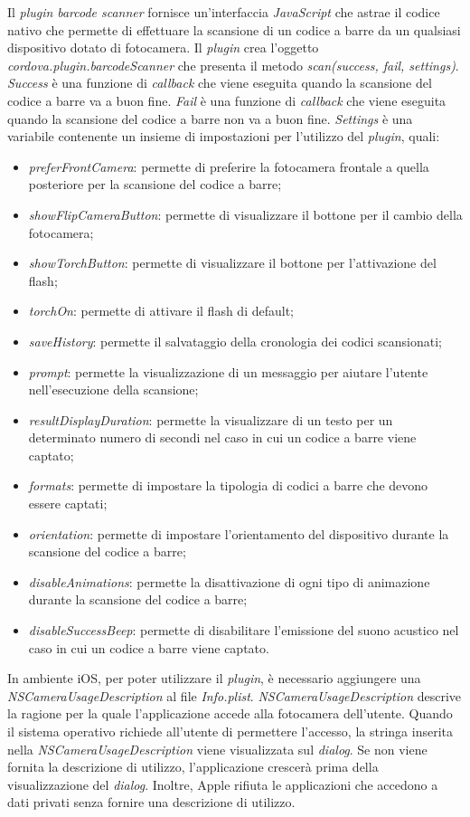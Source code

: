Il \textit{plugin} \textit{barcode scanner} fornisce un'interfaccia \textit{JavaScript} che astrae il codice nativo che permette di effettuare la scansione di un codice a barre da un qualsiasi dispositivo dotato di fotocamera. Il \textit{plugin} crea l'oggetto \textit{cordova.plugin.barcodeScanner} che presenta il metodo \textit{scan(success, fail, settings)}. \textit{Success} è una funzione di \textit{callback} che viene eseguita quando la scansione del codice a barre va a buon fine. \textit{Fail} è una funzione di \textit{callback} che viene eseguita quando la scansione del codice a barre non va a buon fine. \textit{Settings} è una variabile contenente un insieme di impostazioni per l'utilizzo del \textit{plugin}, quali:
\begin{itemize}
	\item \textit{preferFrontCamera}: permette di preferire la fotocamera frontale a quella posteriore per la scansione del codice a barre;
	\item \textit{showFlipCameraButton}: permette di visualizzare il bottone per il cambio della fotocamera;
	\item \textit{showTorchButton}: permette di visualizzare il bottone per l'attivazione del flash;
	\item \textit{torchOn}: permette di attivare il flash di default;
	\item \textit{saveHistory}: permette il salvataggio della cronologia dei codici scansionati;
	\item \textit{prompt}: permette la visualizzazione di un messaggio per aiutare l'utente nell'esecuzione della scansione;
	\item \textit{resultDisplayDuration}: permette la visualizzare di un testo per un determinato numero di secondi nel caso in cui un codice a barre viene captato;
	\item \textit{formats}: permette di impostare la tipologia di codici a barre che devono essere captati;
	\item \textit{orientation}: permette di impostare l'orientamento del dispositivo durante la scansione del codice a barre;
	\item \textit{disableAnimations}: permette la disattivazione di ogni tipo di animazione durante la scansione del codice a barre;
	\item \textit{disableSuccessBeep}: permette di disabilitare l'emissione del suono acustico nel caso in cui un codice a barre viene captato.
\end{itemize}
In ambiente iOS, per poter utilizzare il \textit{plugin}, è necessario aggiungere una \textit{NSCameraUsageDescription} al file \textit{Info.plist}. \textit{NSCameraUsageDescription} descrive la ragione per la quale l'applicazione accede alla fotocamera dell'utente. Quando il sistema operativo richiede all'utente di permettere l'accesso, la stringa inserita nella \textit{NSCameraUsageDescription} viene visualizzata sul \textit{dialog}. Se non viene fornita la descrizione di utilizzo, l'applicazione crescerà prima della visualizzazione del \textit{dialog}. Inoltre, Apple rifiuta le applicazioni che accedono a dati privati senza fornire una descrizione di utilizzo. 

